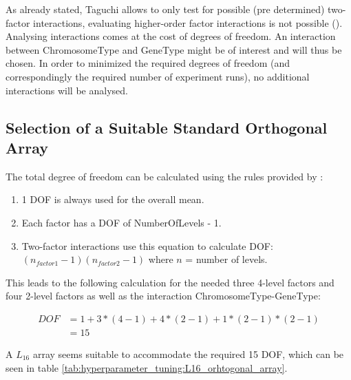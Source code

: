 As already stated, Taguchi allows to only test for possible (pre determined) two-factor interactions, evaluating higher-order factor interactions is not possible (\cite{yang_design_2009}). Analysing interactions comes at the cost of degrees of freedom. An interaction between ChromosomeType and GeneType might be of interest and will thus be chosen. In order to minimized the required degrees of freedom (and correspondingly the required number of experiment runs), no additional interactions will be analysed.

\subsection{Selection of a Suitable Standard Orthogonal Array}
\label{sect:hyperparameter_tuning:selection_orthogonal_array}
The total degree of freedom can be calculated using the rules provided by \cite{yang_design_2009}:

\begin{enumerate}
	\item 1 DOF is always used for the overall mean. 
	\item Each factor has a DOF of NumberOfLevels - 1.
	\item Two-factor interactions use this equation to calculate DOF: $(n_{factor1} - 1)(n_{factor2} - 1)$ where $n$ = number of levels.
\end{enumerate}

This leads to the following calculation for the needed three 4-level factors and four 2-level factors as well as the interaction ChromosomeType-GeneType:

\begin{equation}
	\begin{split}
		DOF & = 1 + 3 * (4 - 1) + 4 * (2 - 1) + 1 * (2 - 1) * (2 - 1) \\
		& = 15
	\end{split}
	 \label{equ:hyperparam_tuning:DOF}
\end{equation}

A $L_{16}$ array seems suitable to accommodate the required 15 DOF, which can be seen in table \ref{tab:hyperparameter_tuning:L16_orhtogonal_array}.

